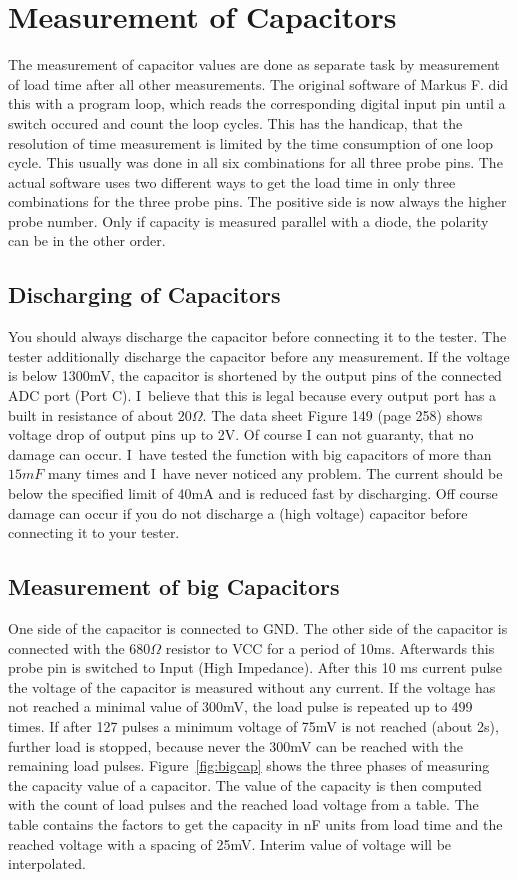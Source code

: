 \section{Measurement of Capacitors}
The measurement of capacitor values are done as separate task by measurement of load time
after all other measurements. 
The original software of Markus F. did this with a program loop, which reads the corresponding digital input
pin until a switch occured and count the loop cycles.
This has the handicap, that the resolution of time measurement is limited by the
time consumption of one loop cycle.
This usually was done in all six combinations for all three probe pins. 
The actual software uses two different ways to get the load time in only
three combinations for the three probe pins. The positive side is now always the
higher probe number. Only if capacity is measured parallel with a diode, the
polarity can be in the other order.

\subsection{Discharging of Capacitors}
You should always discharge the capacitor before connecting it to the tester.
The tester additionally discharge the capacitor before any measurement.
If the voltage is below 1300mV, the capacitor is shortened by the output pins of the connected ADC port (Port C).
I~believe that this is legal because every output port has a built in resistance of about \(20\Omega\).
The data sheet Figure 149 (page 258) \cite{ATmega8} shows voltage drop of output pins up to 2V.
Of course I can not guaranty, that no damage can occur. 
I~have tested the function with big capacitors of more than \(15 mF\) many times and I~have never noticed any problem.
The current should be below the specified limit of 40mA and is reduced fast by discharging.
Off course damage can occur if you do not discharge a (high voltage) capacitor before connecting it to your tester.

\subsection{Measurement of big Capacitors}
\label{sec:bigcap}
One side of the capacitor is connected to GND. The other side of the capacitor is connected with the
\(680\Omega\) resistor to VCC for a period of 10ms. Afterwards this probe pin is switched to Input (High Impedance).
After this 10 ms current pulse the voltage of the capacitor is measured without any current. If the voltage has not
reached a minimal value of 300mV, the load pulse is repeated up to 499 times.
If after 127 pulses a minimum voltage of 75mV is not reached (about 2s), further load is stopped, because never
the 300mV can be reached with the remaining load pulses.
Figure~\ref{fig:bigcap} shows the three phases of measuring the capacity value of a capacitor.
The value of the capacity is then computed with the count of load pulses and the reached load voltage from a table.
The table contains  the factors to get the capacity in nF units from load time and the reached voltage
with a spacing of 25mV.
Interim value of voltage will be interpolated.

